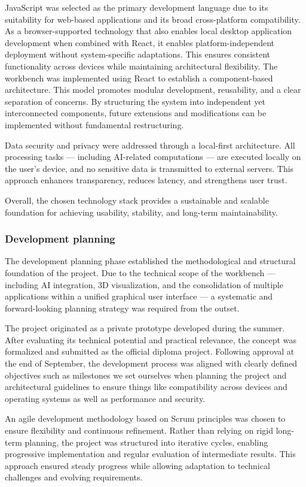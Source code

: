 \documentclass[a4paper,12pt]{article}
\begin{document}
JavaScript was selected as the primary development language due to its suitability for web-based applications and its broad cross-platform compatibility. As a browser-supported technology that also enables local desktop application development when combined with React, it enables platform-independent deployment without system-specific adaptations. This ensures consistent functionality across devices while maintaining architectural flexibility.
The workbench was implemented using React to establish a component-based architecture. This model promotes modular development, reusability, and a clear separation of concerns. By structuring the system into independent yet interconnected components, future extensions and modifications can be implemented without fundamental restructuring.

Data security and privacy were addressed through a local-first architecture. All processing tasks — including AI-related computations — are executed locally on the user’s device, and no sensitive data is transmitted to external servers. This approach enhances transparency, reduces latency, and strengthens user trust.

Overall, the chosen technology stack provides a sustainable and scalable foundation for achieving usability, stability, and long-term maintainability.

\subsubsection{Development planning}
The development planning phase established the methodological and structural foundation of the project. Due to the technical scope of the workbench — including AI integration, 3D visualization, and the consolidation of multiple applications within a unified graphical user interface — a systematic and forward-looking planning strategy was required from the outset.

The project originated as a private prototype developed during the summer. After evaluating its technical potential and practical relevance, the concept was formalized and submitted as the official diploma project. Following approval at the end of September, the development process was aligned with clearly defined objectives such as milestones we set ourselves when planning the project and architectural guidelines to ensure things like compatibility across devices and operating systems as well as performance and security.

An agile development methodology based on Scrum principles was chosen to ensure flexibility and continuous refinement. Rather than relying on rigid long-term planning, the project was structured into iterative cycles, enabling progressive implementation and regular evaluation of intermediate results. This approach ensured steady progress while allowing adaptation to technical challenges and evolving requirements.
\end{document}
